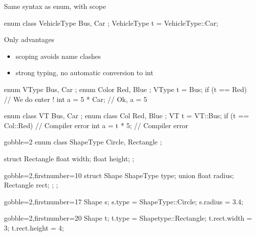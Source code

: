 \begin{frame}[fragile]
  \begin{block}{Same syntax as enum, with scope}
    \begin{cppcode*}{}
      enum class VehicleType { Bus, Car };
      VehicleType t = VehicleType::Car;
    \end{cppcode*}
  \end{block}
  \pause
  \begin{exampleblock}{Only advantages}
    \begin{itemize}
    \item scoping avoids name clashes
    \item strong typing, no automatic conversion to int
    \end{itemize}
    \small
    \begin{cppcode*}{}
      enum VType { Bus, Car }; enum Color { Red, Blue };
      VType t = Bus;
      if (t == Red) {  // We do enter !  }
      int a = 5 * Car; // Ok, a = 5

      enum class VT { Bus, Car }; enum class Col { Red, Blue };
      VT t = VT::Bus;
      if (t == Col::Red) { // Compiler error }
      int a = t * 5;       // Compiler error
    \end{cppcode*}
  \end{exampleblock}
\end{frame}

\begin{frame}[fragile]
  \begin{multicols}{2}
    \begin{cppcode*}{gobble=2}
      enum class ShapeType {
        Circle,
        Rectangle
      };

      struct Rectangle {
        float width;
        float height;
      };
    \end{cppcode*}
    \columnbreak
    \pause
    \begin{cppcode*}{gobble=2,firstnumber=10}
      struct Shape {
        ShapeType type;
        union {
          float radius;
          Rectangle rect;
        };
      };
    \end{cppcode*}
  \end{multicols}
  \pause
  \begin{multicols}{2}
    \begin{cppcode*}{gobble=2,firstnumber=17}
      Shape s;
      s.type =
        ShapeType::Circle;
      s.radius = 3.4;

    \end{cppcode*}
    \columnbreak
    \begin{cppcode*}{gobble=2,firstnumber=20}
      Shape t;
      t.type =
        Shapetype::Rectangle;
      t.rect.width = 3;
      t.rect.height = 4;
    \end{cppcode*}
  \end{multicols}
\end{frame}


